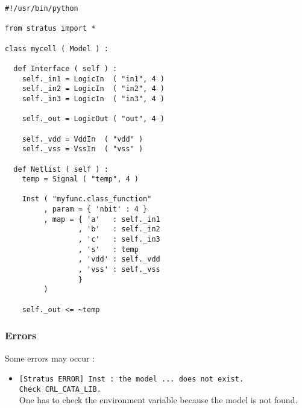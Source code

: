 \begin{verbatim}
#!/usr/bin/python

from stratus import *

class mycell ( Model ) :
    
  def Interface ( self ) :
    self._in1 = LogicIn  ( "in1", 4 )
    self._in2 = LogicIn  ( "in2", 4 )
    self._in3 = LogicIn  ( "in3", 4 )
    
    self._out = LogicOut ( "out", 4 )
    
    self._vdd = VddIn  ( "vdd" )
    self._vss = VssIn  ( "vss" )

  def Netlist ( self ) :
    temp = Signal ( "temp", 4 )
      
    Inst ( "myfunc.class_function"
         , param = { 'nbit' : 4 }
         , map = { 'a'   : self._in1
                 , 'b'   : self._in2
                 , 'c'   : self._in3
                 , 's'   : temp
                 , 'vdd' : self._vdd
                 , 'vss' : self._vss
                 }
         )

    self._out <= ~temp
\end{verbatim}
    
\subsubsection{Errors}
    
Some errors may occur :
\begin{itemize}
    \item \verb-[Stratus ERROR] Inst : the model ... does not exist.-\\\verb-Check CRL_CATA_LIB.-\\One has to check the environment variable because the model is not found.
\end{itemize}



